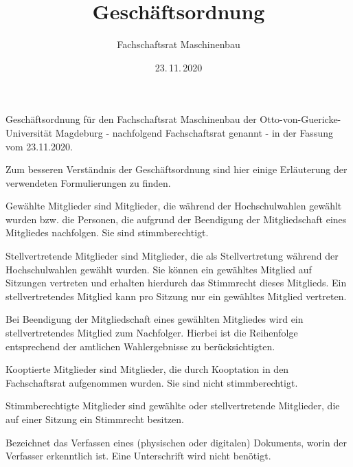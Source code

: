 \documentclass[%
    parskip=half,
]{scrartcl}
\begin{document}
\title{Geschäftsordnung}
\date{23.\,11.\,2020}
\author{Fachschaftsrat Maschinenbau}

\maketitle

Geschäftsordnung für den Fachschaftsrat Maschinenbau der Otto-von-Guericke-Universität Magdeburg - nachfolgend Fachschaftsrat genannt - in der Fassung vom 23.11.2020.

\tableofcontents

\clearpage


Zum besseren Verständnis der Geschäftsordnung sind hier einige Erläuterung der verwendeten Formulierungen zu finden.


Gewählte Mitglieder sind Mitglieder, die während der Hochschulwahlen gewählt wurden bzw. die Personen, die aufgrund der Beendigung der Mitgliedschaft eines Mitgliedes nachfolgen.
Sie sind stimmberechtigt.


Stellvertretende Mitglieder sind Mitglieder, die als Stellvertretung während der Hochschulwahlen gewählt wurden.
Sie können ein gewähltes Mitglied auf Sitzungen vertreten und erhalten hierdurch das Stimmrecht dieses Mitglieds.
Ein stellvertretendes Mitglied kann pro Sitzung nur ein gewähltes Mitglied vertreten.

Bei Beendigung der Mitgliedschaft eines gewählten Mitgliedes wird ein stellvertretendes Mitglied zum Nachfolger.
Hierbei ist die Reihenfolge entsprechend der amtlichen Wahlergebnisse zu berücksichtigten.


Kooptierte Mitglieder sind Mitglieder, die durch Kooptation in den Fachschaftsrat aufgenommen wurden.
Sie sind nicht stimmberechtigt.


Stimmberechtigte Mitglieder sind gewählte oder stellvertretende Mitglieder, die auf einer Sitzung ein Stimmrecht besitzen.


Bezeichnet das Verfassen eines (physischen oder digitalen) Dokuments, worin der Verfasser erkenntlich ist.
Eine Unterschrift wird nicht benötigt.
\end{document}
